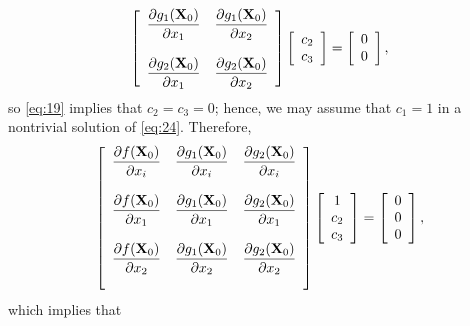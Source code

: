 \documentclass{article}
\newcommand{\dst}{\displaystyle}
\begin{document}
$$
\left[\begin{array}{ccccccc}
\dst{\frac{{\partial g_{1}({\bf X}_{0})}}{{\partial  x_{1}}}}&
\dst{\frac{{\partial g_{1}({\bf X}_{0})}}{{\partial  x_{2}}}}\\\\
\dst{\frac{{\partial g_{2}({\bf X}_{0})}}{{\partial  x_{1}}}}&
\dst{\frac{{\partial g_{2}({\bf X}_{0})}}{{\partial  x_{2}}}}\\
\end{array}\right]
\left[\begin{array}{ccccccc}
c_{2}\\c_{3}
\end{array}\right]=
\left[\begin{array}{ccccccc}
0\\0
\end{array}\right],
$$
so \eqref{eq:19} implies that $c_{2}=c_{3}=0$;
hence, we
may assume that $c_{1}=1$ in a nontrivial solution of \eqref{eq:24}.
Therefore,
\begin{equation} \label{eq:25}
\left[\begin{array}{ccccccc}
\dst{\frac{{\partial f({\bf X}_{0})}}{{\partial  x_{i}}}}&
\dst{\frac{{\partial g_{1}({\bf X}_{0})}}{{\partial  x_{i}}}}&
\dst{\frac{{\partial g_{2}({\bf X}_{0})}}{{\partial  x_{i}}}}\\\\
\dst{\frac{{\partial f({\bf X}_{0})}}{{\partial  x_{1}}}}&
\dst{\frac{{\partial g_{1}({\bf X}_{0})}}{{\partial  x_{1}}}}&
\dst{\frac{{\partial g_{2}({\bf X}_{0})}}{{\partial  x_{1}}}}\\\\
\dst{\frac{{\partial f({\bf X}_{0})}}{{\partial  x_{2}}}}&
\dst{\frac{{\partial g_{1}({\bf X}_{0})}}{{\partial  x_{2}}}}&
\dst{\frac{{\partial g_{2}({\bf X}_{0})}}{{\partial  x_{2}}}}\\\\
\end{array}\right]
\left[\begin{array}{ccccccc}
1\\c_{2}\\c_{3}
\end{array}\right]=
\left[\begin{array}{ccccccc}
0\\0\\0
\end{array}\right],
\end{equation}
which implies that
\end{document}

